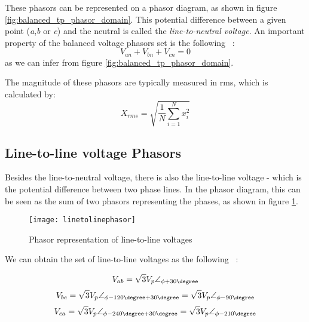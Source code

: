 These phasors can be represented on a phasor diagram, as shown in figure \ref{fig:balanced_tp_phasor_domain}. This potential difference between a given point (\emph{a},\emph{b} or \emph{c}) and the neutral is called the \emph{line-to-neutral voltage}. 
An important property of the balanced voltage phasors set is the following ~\cite[chapter 11, p.~547]{Helfenstein2000}:
\begin{equation} \label{eq:balanced_prop1}
	V_{an} + V_{bn} + V_{cn} = 0
\end{equation}
as we can infer from figure \ref{fig:balanced_tp_phasor_domain}.

The magnitude of these phasors are typically measured in \acrfull{rms}, which is calculated by:
\begin{equation} \label{eq:rms}
	X_{rms} = \sqrt{\frac{1}{N}\sum\limits_{i=1}^{N}x_{i}^2}
\end{equation}

\subsection{Line-to-line voltage Phasors}

Besides the line-to-neutral voltage, there is also the line-to-line voltage - which is the potential difference between two phase lines.
In the phasor diagram, this can be seen as the sum of two phasors representing the phases, as shown in figure \ref{fig:line_to_line_phasors}.


\begin{figure}[htbp]
	\centering
	\texttt{[image: linetolinephasor]}
	\caption{Phasor representation of line-to-line voltages}
	\label{fig:line_to_line_phasors}
\end{figure}

We can obtain the set of line-to-line voltages as the following ~\cite[chapter 11, p.~548]{Helfenstein2000}:

\begin{equation} \label{eq:balanced_tpVab}
	V_{ab} = \sqrt{3}V_{p}\angle_{\phi+30\degree}
\end{equation}
\begin{equation} \label{eq:balanced_tpVbc}
	V_{bc} = \sqrt{3}V_{p}\angle_{\phi - 120\degree + 30\degree} = \sqrt{3}V_{p}\angle_{\phi - 90\degree}
\end{equation}
\begin{equation} \label{eq:balanced_tpVca}
	V_{ca} = \sqrt{3}V_{p}\angle_{\phi - 240\degree + 30\degree} = \sqrt{3}V_{p}\angle_{\phi -210\degree} 
\end{equation}

